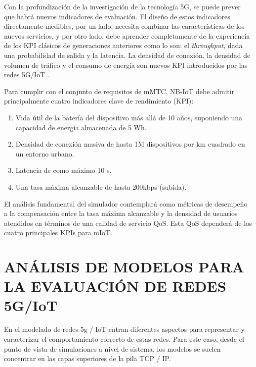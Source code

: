 Con la profundización de la investigación de la tecnología 5G, se puede prever que habrá nuevos indicadores de evaluación. El diseño de estos indicadores directamente medibles, por un lado, necesita combinar las características de los nuevos servicios, y por otro lado, debe aprender completamente de la experiencia de los KPI clásicos de generaciones anteriores como lo son: el \textit{throughput, }dada una\textit{ }probabilidad de salida y la latencia. La densidad de conexión, la densidad de volumen de tráfico y el consumo de energía son nuevos KPI introducidos por las redes 5G/IoT \parencite{WirelessSim}.\newline

Para cumplir con el conjunto de requisitos de mMTC, NB-IoT debe admitir principalmente cuatro indicadores clave de rendimiento (KPI):

\begin{enumerate}
\item  Vida útil de la batería del dispositivo más allá de 10 años, suponiendo una capacidad de energía almacenada de 5 Wh.
\item  Densidad de conexión masiva de hasta 1M dispositivos por km cuadrado en un entorno urbano.
\item  Latencia de como máximo 10 s.
\item  Una tasa máxima alcanzable de hasta 200kbps (subida).
\end{enumerate}

El análisis fundamental del simulador contemplará como métricas de desempeño a la compensación entre la tasa máxima alcanzable y la densidad de usuarios atendidos en términos de una calidad de servicio QoS. Esta QoS dependerá de los cuatro principales KPIs para mIoT.

\break

\section{ANÁLISIS DE MODELOS PARA LA EVALUACIÓN DE REDES 5G/IoT}\label{AnalisisMODELOS}
En el modelado de redes 5g / IoT entran diferentes aspectos para representar y caracterizar el comportamiento correcto de estas redes. Para este caso, desde el punto de vista de simulaciones a nivel de sistema, los modelos se suelen concentrar en las capas superiores de la pila TCP / IP.\newline

